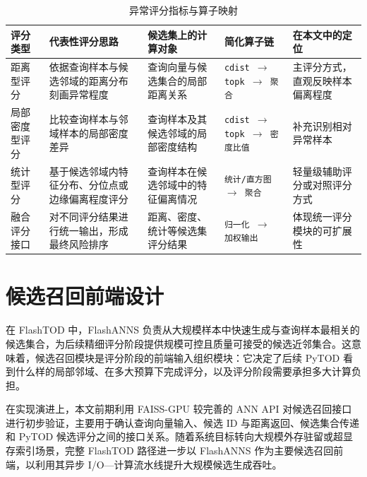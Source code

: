 \begin{table}[htbp]
  \caption{异常评分指标与算子映射}
  \label{tab:score-ops-map}
  \centering
  \small
  \renewcommand{\arraystretch}{1.2}
  \begin{adjustbox}{max width=\linewidth}
  \begin{tabular}{P{2.1cm} P{4.0cm} P{3.5cm} P{3.2cm} P{3.7cm}}
    \toprule
    评分类型 & 代表性评分思路 & 候选集上的计算对象 & 简化算子链 & 在本文中的定位\\
    \midrule
    距离型评分 & 依据查询样本与候选邻域的距离分布刻画异常程度 & 查询向量与候选集合的局部距离关系 & \texttt{cdist $\rightarrow$ topk $\rightarrow$ 聚合} & 主评分方式，直观反映样本偏离程度\\
    局部密度型评分 & 比较查询样本与邻域样本的局部密度差异 & 查询样本及其候选邻域的局部密度结构 & \texttt{cdist $\rightarrow$ topk $\rightarrow$ 密度比值} & 补充识别相对异常样本\\
    统计型评分 & 基于候选邻域内特征分布、分位点或边缘偏离程度评分 & 查询样本在候选邻域中的特征偏离情况 & \texttt{统计/直方图 $\rightarrow$ 聚合} & 轻量级辅助评分或对照评分方式\\
    融合评分接口 & 对不同评分结果进行统一输出，形成最终风险排序 & 距离、密度、统计等候选集评分结果 & \texttt{归一化 $\rightarrow$ 加权输出} & 体现统一评分模块的可扩展性\\
    \bottomrule
  \end{tabular}
  \end{adjustbox}
\end{table}

\FloatBarrier

\section{候选召回前端设计}

在 FlashTOD 中，FlashANNS 负责从大规模样本中快速生成与查询样本最相关的候选集合，为后续精细评分阶段提供规模可控且质量可接受的候选近邻集合\citep{xiao2025flashanns}。这意味着，候选召回模块是评分阶段的前端输入组织模块：它决定了后续 PyTOD 看到什么样的局部邻域、在多大预算下完成评分，以及评分阶段需要承担多大计算负担。

在实现演进上，本文前期利用 FAISS-GPU 较完善的 ANN API 对候选召回接口进行初步验证，主要用于确认查询向量输入、候选 ID 与距离返回、候选集合传递和 PyTOD 候选评分之间的接口关系。随着系统目标转向大规模外存驻留或超显存索引场景，完整 FlashTOD 路径进一步以 FlashANNS 作为主要候选召回前端，以利用其异步 I/O---计算流水线提升大规模候选生成吞吐。

